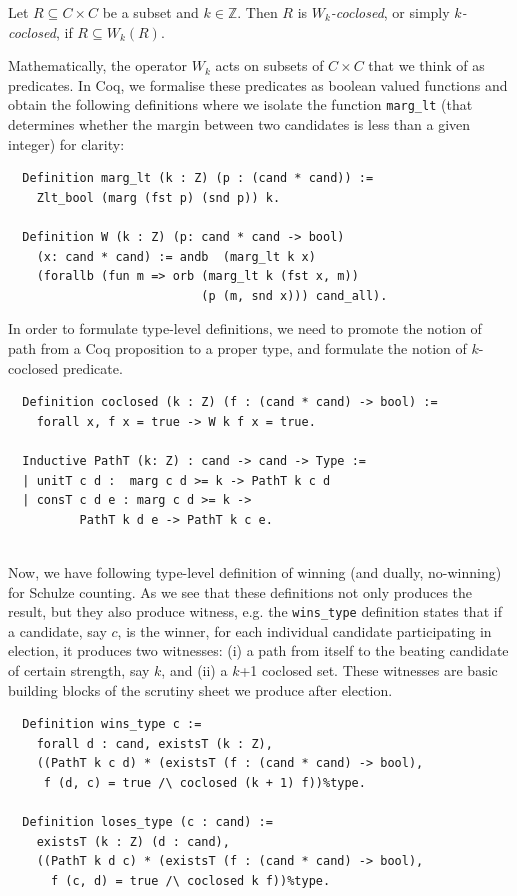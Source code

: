 \begin{definition} Let $R \subseteq C \times C$ be a subset and $k \in
\mathbb{Z}$. Then $R$ is \emph{$W_k$-coclosed}, or simply
\emph{$k$-coclosed}, if $R \subseteq W_k(R)$.
\end{definition}

\noindent
Mathematically, the operator $W_k$ acts on subsets of $C \times C$
that we think of as predicates. In Coq, we formalise these
predicates as boolean valued functions and obtain the following
definitions where we isolate the function \texttt{marg\_lt} (that
determines whether the margin between two candidates is less than a
given integer) for clarity:


\begin{verbatim}
  Definition marg_lt (k : Z) (p : (cand * cand)) :=
    Zlt_bool (marg (fst p) (snd p)) k.

  Definition W (k : Z) (p: cand * cand -> bool) 
    (x: cand * cand) := andb  (marg_lt k x)
    (forallb (fun m => orb (marg_lt k (fst x, m)) 
                           (p (m, snd x))) cand_all).
\end{verbatim}

\noindent
In order to formulate type-level definitions, we need to promote the
notion of path from a Coq proposition to a proper type, and
formulate the notion of $k$-coclosed predicate.

\begin{verbatim} 
  Definition coclosed (k : Z) (f : (cand * cand) -> bool) :=
    forall x, f x = true -> W k f x = true.

  Inductive PathT (k: Z) : cand -> cand -> Type :=
  | unitT c d :  marg c d >= k -> PathT k c d
  | consT c d e : marg c d >= k -> 
          PathT k d e -> PathT k c e.
 
\end{verbatim}


\noindent
Now, we have following type-level definition of winning (and dually, 
no-winning) for Schulze counting. As we see that these definitions not only produces 
the result, but they also produce witness, e.g. the \texttt{wins\_type} definition 
states that if a candidate, say $c$, is the winner,  
for each individual candidate participating in election, it produces two witnesses:
(i) a path from itself to the beating candidate of certain strength, say $k$, and 
(ii) a $k$+1 coclosed set.  These witnesses are basic building blocks of the 
scrutiny sheet we produce after election. 

\begin{verbatim}
  Definition wins_type c := 
    forall d : cand, existsT (k : Z),
    ((PathT k c d) * (existsT (f : (cand * cand) -> bool),
     f (d, c) = true /\ coclosed (k + 1) f))%type.

  Definition loses_type (c : cand) := 
    existsT (k : Z) (d : cand),
    ((PathT k d c) * (existsT (f : (cand * cand) -> bool),
      f (c, d) = true /\ coclosed k f))%type.
\end{verbatim}

